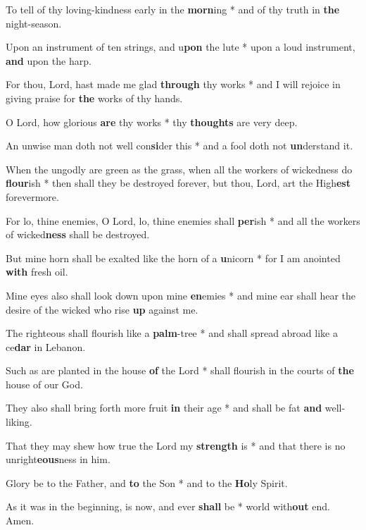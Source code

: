 \begin{multicols}{2}
	To tell of thy loving-kindness early in the \textbf{morn}ing * and of thy truth in \textbf{the} night-season.
	
	Upon an instrument of ten strings, and u\textbf{pon} the lute * upon a loud instrument, \textbf{and} upon the harp.
	
	For thou, Lord, hast made me glad \textbf{through} thy works * and I will rejoice in giving praise for \textbf{the} works of thy hands.
	
	O Lord, how glorious \textbf{are} thy works * thy \textbf{thoughts} are very deep.
	
	An unwise man doth not well con\textbf{si}der this * and a fool doth not \textbf{un}derstand it.
	
	When the ungodly are green as the grass, when all the workers of wickedness do \textbf{flour}ish * then shall they be destroyed forever, but thou, Lord, art the High\textbf{est} forevermore.
	
	For lo, thine enemies, O Lord, lo, thine enemies shall \textbf{per}ish * and all the workers of wicked\textbf{ness} shall be destroyed.
	
	But mine horn shall be exalted like the horn of a \textbf{u}nicorn * for I am anointed \textbf{with} fresh oil.
	
	Mine eyes also shall look down upon mine \textbf{en}emies * and mine ear shall hear the desire of the wicked who rise \textbf{up} against me.
	
	The righteous shall flourish like a \textbf{palm}-tree * and shall spread abroad like a ce\textbf{dar} in Lebanon.
	
	Such as are planted in the house \textbf{of} the Lord * shall flourish in the courts of \textbf{the} house of our God.
	
	They also shall bring forth more fruit \textbf{in} their age * and shall be fat \textbf{and} well-liking.
	
	That they may shew how true the Lord my \textbf{strength} is * and that there is no unright\textbf{eous}ness in him.
	
	Glory be to the Father, and \textbf{to} the Son * and to the \textbf{Ho}ly Spirit.
	
	As it was in the beginning, is now, and ever \textbf{shall} be * world with\textbf{out} end. Amen.
\end{multicols}